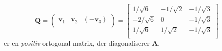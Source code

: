 \begin{example}
\begin{equation}
\mathbf{Q} = \left(
               \begin{array}{ccc}
                 \mathbf{v}_{1} & \mathbf{v}_{2} & (-\mathbf{v}_{3}) \\
               \end{array}
             \right)
 = \left[
                                                            \begin{array}{rrr}
                                                              1/\sqrt{6} & -1/\sqrt{2} & -1/\sqrt{3} \\
                                                              -2/\sqrt{6} & 0 &-1/\sqrt{3} \\
                                                              1/\sqrt{6} & 1/\sqrt{2} & -1/\sqrt{3} \\
                                                            \end{array}
                                                          \right]
\end{equation}
er en {\em{positiv}} ortogonal matrix, der diagonaliserer $\mathbf{A}$. \\


\end{example}

